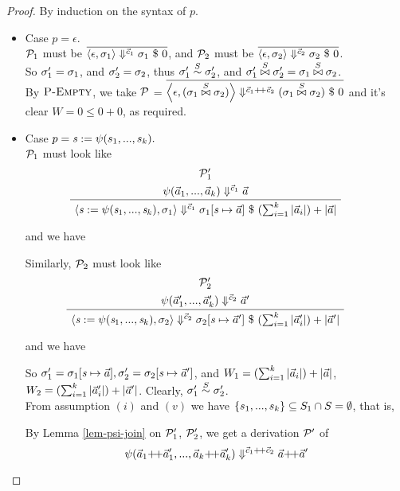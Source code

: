 \begin{proof}
	By induction on the syntax of $p$.
\def\sgmx{(\sgm_1 \x{\S} \sgm_2)}
\def\sgmpx{(\sgm_1' \x{\S} \sgm_2')}
\def\cc{\c_1 {\++} \c_2}

 
	\begin{itemize}
	\item Case $p = \epsilon$. \\
	$\MP_1$ must be $\overline{\seval{\epsilon}{\sgm_1}{\c_1}{\sgm_1}{0}}$, and
	$\MP_2$ must be $\overline{\seval{\epsilon}{\sgm_2}{\c_2}{\sgm_2}{0}}$. \\
	So $\sgm_1' = \sgm_1$, and $\sgm_2' = \sgm_2$, thus $\sgm_1' \~{\S} \sgm'_2$, and $\sgm_1' \x{\S} \sgm_2' = \sgm_1 \x{\S} \sgm_2$. \\
	
	By $\PName{Empty}$, we take $\MP$ = $\overline{\seval{\epsilon}{\sgmx}{\c_1 {\++} \c_2}{\sgmx}{0}}$ and it's clear $W= 0 \le 0+0$, as required. 
	
\item Case $p = \sdef{\s}{\lcall(s_1,...,s_k)}.$ \\
\def\casetwo{\sdef{\s}{\lcall\Tupk\s}}	
\def\eqnumtwo#1{eq-lem24-c2-{#1}}
	$\MP_1$ must look like 
	$$\PT{\UCN{\MP'_{1}}{\sevalf{\a_1}{\a_k}{\c_1}{\a}}
			\UC{\seval{\sdef{\s}{\lcall\Tupk\s}}{\sgm_1}{\c_1}{\sgm_1[\s \|-> \a]}{(\sum_{i=1}^{k}|\a_i|) + |\a|}}
	} $$

	and we have 
	
	
    Similarly, $\MP_2$ must look like 
	$$\PT{\UCN{\MP'_{2}}{\sevalf{\a_1'}{\a_k'}{\c_2}{\a'}}
		\UC{\seval{\sdef{\s}{\lcall\Tupk\s}}{\sgm_2}{\c_2}{\sgm_2[\s \|-> \a']}{(\sum_{i=1}^{k}|\a'_i|) + |\a'|}}
	} $$
	
	and we have
	
	So  $\sgm_1' = \sgm_1[\s \|-> \a], \sgm_2' = \sgm_2[\s \|-> \a']$, and $W_1 = (\sum_{i=1}^{k}|\a_i|) + |\a|$, $W_2 = (\sum_{i=1}^{k}|\a'_i|) + |\a'|$. 
	Clearly, $\sgm_1' \~\S \sgm_2'$. \\
	
	From assumption $(i)$ and $(v)$ we have $\{s_1,...,s_k\} \subseteq \S_1 \cap \S = \emptyset$,
    that is, 

    
    By Lemma \ref{lem-psi-join} on $\MP'_{1}$, $\MP'_{2}$, we get a derivation $\MP'$ of 
    \[ \sevalfg{\lcall}{\a_1  {\++} \a_1',...,\a_k {\++} \a_k' } 
             {\c_1 {\++} \c_2} {\a {\++} \a'} \]
    

\end{itemize}
\end{proof}
